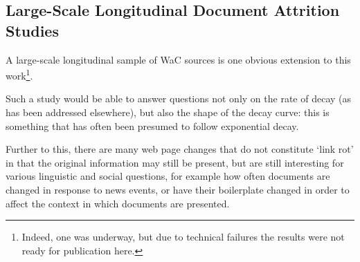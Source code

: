 




%





\subsection{Large-Scale Longitudinal Document Attrition Studies}
A large-scale longitudinal sample of WaC sources is one obvious extension to this work\footnote{Indeed, one was underway, but due to technical failures the results were not ready for publication here.}.

Such a study would be able to answer questions not only on the rate of decay (as has been addressed elsewhere), but also the shape of the decay curve: this is something that has often been presumed to follow exponential decay.

Further to this, there are many web page changes that do not constitute `link rot' in that the original information may still be present, but are still interesting for various linguistic and social questions, for example how often documents are changed in response to news events, or have their boilerplate changed in order to affect the context in which documents are presented.

